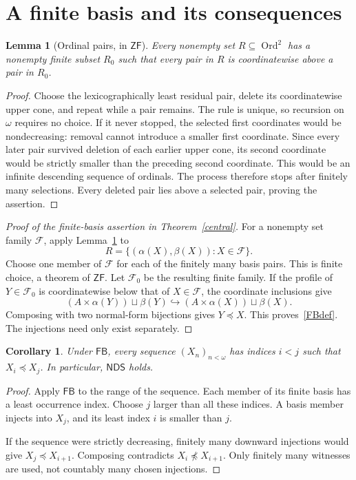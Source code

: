 \documentclass[11pt,a4paper]{article}
\newcommand{\ZF}{\mathsf{ZF}}
\newcommand{\NDS}{\mathsf{NDS}}
\newcommand{\FB}{\mathsf{FB}}
\newcommand{\Ord}{\operatorname{Ord}}
\newcommand{\inj}{\hookrightarrow}
\newtheorem{lemma}[theorem]{Lemma}
\newtheorem{corollary}[theorem]{Corollary}
\theoremstyle{definition}
\theoremstyle{remark}
\begin{document}
\section{A finite basis and its consequences}\label{finitebasis}

\begin{lemma}[Ordinal pairs, in $\ZF$]\label{ordpairs}
Every nonempty set $R\subseteq\Ord^2$ has a nonempty finite subset $R_0$ such that every pair in $R$ is coordinatewise above a pair in $R_0$.
\end{lemma}
\begin{proof}
Choose the lexicographically least residual pair, delete its coordinatewise upper cone, and repeat while a pair remains. The rule is unique, so recursion on $\omega$ requires no choice. If it never stopped, the selected first coordinates would be nondecreasing: removal cannot introduce a smaller first coordinate. Since every later pair survived deletion of each earlier upper cone, its second coordinate would be strictly smaller than the preceding second coordinate. This would be an infinite descending sequence of ordinals. The process therefore stops after finitely many selections. Every deleted pair lies above a selected pair, proving the assertion.
\end{proof}

\begin{proof}[Proof of the finite-basis assertion in Theorem~\ref{central}]
For a nonempty set family $\mathcal F$, apply Lemma~\ref{ordpairs} to
\[
 R=\{(\alpha(X),\beta(X)):X\in\mathcal F\}.
\]
Choose one member of $\mathcal F$ for each of the finitely many basis pairs. This is finite choice, a theorem of $\ZF$. Let $\mathcal F_0$ be the resulting finite family. If the profile of $Y\in\mathcal F_0$ is coordinatewise below that of $X\in\mathcal F$, the coordinate inclusions give
\[
 (A\times\alpha(Y))\sqcup\beta(Y)
 \inj (A\times\alpha(X))\sqcup\beta(X).
\]
Composing with two normal-form bijections gives $Y\preccurlyeq X$. This proves~\eqref{FBdef}. The injections need only exist separately.
\end{proof}

\begin{corollary}\label{seq}
Under $\FB$, every sequence $(X_n)_{n<\omega}$ has indices $i<j$ such that $X_i\preccurlyeq X_j$. In particular, $\NDS$ holds.
\end{corollary}
\begin{proof}
Apply $\FB$ to the range of the sequence. Each member of its finite basis has a least occurrence index. Choose $j$ larger than all these indices. A basis member injects into $X_j$, and its least index $i$ is smaller than $j$.

If the sequence were strictly decreasing, finitely many downward injections would give $X_j\preccurlyeq X_{i+1}$. Composing contradicts $X_i\not\preccurlyeq X_{i+1}$. Only finitely many witnesses are used, not countably many chosen injections.
\end{proof}
\end{document}

